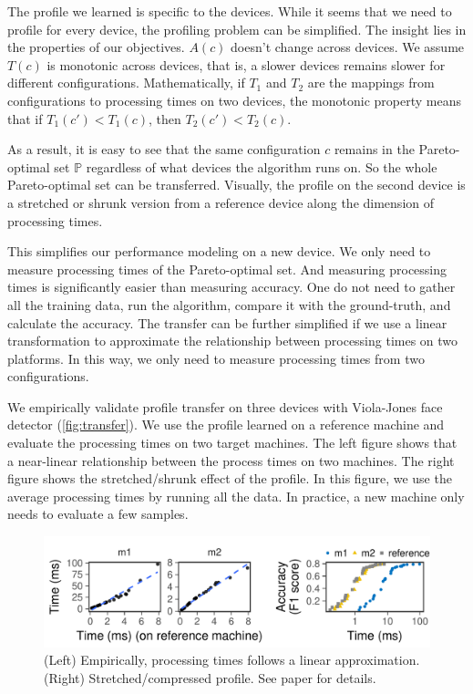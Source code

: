 The profile we learned is specific to the devices. While it seems that we need
to profile for every device, the profiling problem can be simplified. The
insight lies in the properties of our objectives. $A(c)$ doesn't change across
devices. We assume $T(c)$ is monotonic across devices, that is, a slower devices
remains slower for different configurations. Mathematically, if $T_1$ and $T_2$
are the mappings from configurations to processing times on two devices, the
monotonic property means that if $T_1(c') < T_1(c)$, then $T_2(c') < T_2(c)$.

As a result, it is easy to see that the same configuration $c$ remains in the
Pareto-optimal set $\mathbb{P}$ regardless of what devices the algorithm runs
on. So the whole Pareto-optimal set can be transferred. Visually, the profile on
the second device is a stretched or shrunk version from a reference device along
the dimension of processing times.

This simplifies our performance modeling on a new device. We only need to
measure processing times of the Pareto-optimal set. And measuring processing
times is significantly easier than measuring accuracy. One do not need to gather
all the training data, run the algorithm, compare it with the ground-truth, and
calculate the accuracy. The transfer can be further simplified if we use a
linear transformation to approximate the relationship between processing times
on two platforms. In this way, we only need to measure processing times from two
configurations.

We empirically validate profile transfer on three devices with Viola-Jones face
detector (\autoref{fig:transfer}). We use the profile learned on a reference
machine and evaluate the processing times on two target machines. The left
figure shows that a near-linear relationship between the process times on two
machines. The right figure shows the stretched/shrunk effect of the profile. In
this figure, we use the average processing times by running all the data. In
practice, a new machine only needs to evaluate a few samples.

\begin{figure}
  \centering
  \includegraphics[width=0.9\linewidth]{figures/serving-cross-platform.pdf}
  \caption{(Left) Empirically, processing times follows a linear
    approximation. (Right) Stretched/compressed profile. See paper for
    details.}
  \label{fig:transfer}
\end{figure}

